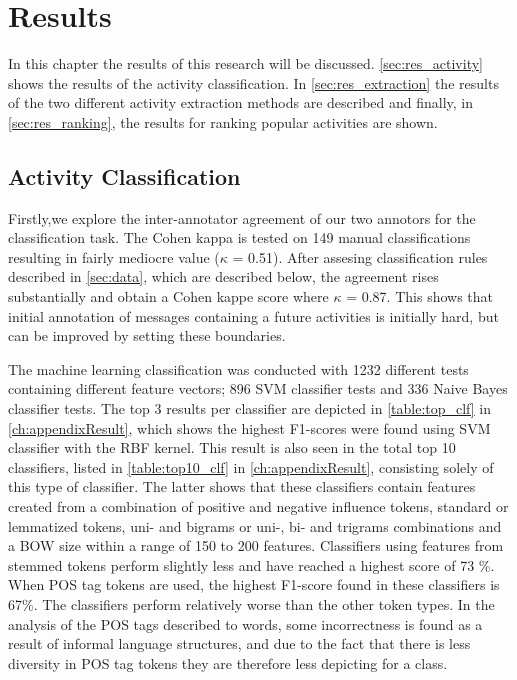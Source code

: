 
\chapter{Results} %

\label{ch:results} %

In this chapter the results of this research will be discussed. \autoref{sec:res_activity} shows the results of the activity classification. In \autoref{sec:res_extraction} the results of the two different activity extraction methods are described and finally, in \autoref{sec:res_ranking}, the results for ranking popular activities are shown.



\section{Activity Classification}\label{sec:res_activity}
Firstly,we explore the inter-annotator agreement of our two annotors for the classification task. The Cohen kappa is tested on 149 manual classifications resulting in fairly mediocre value ($\kappa$ = 0.51). After assesing classification rules described in \autoref{sec:data}, which are described below, the agreement rises substantially and obtain a Cohen kappe score where $\kappa$ = 0.87. This shows that initial annotation of messages containing a future activities is initially hard, but can be improved by setting these boundaries.
 
The machine learning classification was conducted with 1232 different tests containing different feature vectors; 896 SVM classifier tests and 336 Naive Bayes classifier tests. The top 3 results per classifier are depicted in \autoref{table:top_clf} in \autoref{ch:appendixResult}, which shows the highest F1-scores were found using SVM classifier with the RBF kernel. This result is also seen in the total top 10 classifiers, listed in \autoref{table:top10_clf} in \autoref{ch:appendixResult}, consisting solely of this type of classifier. The latter shows that these classifiers contain features created from a combination of positive and negative influence tokens, standard or lemmatized tokens, uni- and bigrams or uni-, bi- and trigrams combinations and a BOW size within a range of 150 to 200 features. Classifiers using features from stemmed tokens perform slightly less and have reached a highest score of 73 \%. When POS tag tokens are used, the highest F1-score found in these classifiers is 67\%. The classifiers perform relatively worse than the other token types. In the analysis of the POS tags described to words, some incorrectness is found as a result of informal language structures, and due to the fact that there is less diversity in POS tag tokens they are therefore less depicting for a class. 

